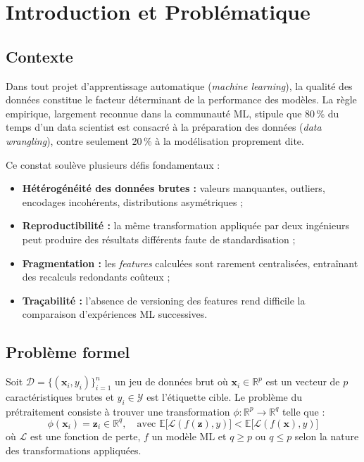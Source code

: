 \documentclass[12pt,a4paper]{article}
\newcounter{defcount}[section]
\newenvironment{definition}[1]{%
  \stepcounter{defcount}%
  \begin{tcolorbox}[defstyle={Définition \thesection.\thedefcount\ — #1}]
}{%
  \end{tcolorbox}
}
\begin{document}
\tableofcontents
\newpage

\section{Introduction et Problématique}

\subsection{Contexte}

Dans tout projet d'apprentissage automatique (\textit{machine learning}), la qualité
des données constitue le facteur déterminant de la performance des modèles.
La règle empirique, largement reconnue dans la communauté ML, stipule que 80\,\% du
temps d'un data scientist est consacré à la préparation des données
(\textit{data wrangling}), contre seulement 20\,\% à la modélisation proprement dite.

Ce constat soulève plusieurs défis fondamentaux :

\begin{itemize}[leftmargin=1.5em]
  \item \textbf{Hétérogénéité des données brutes :} valeurs manquantes, outliers,
    encodages incohérents, distributions asymétriques ;
  \item \textbf{Reproductibilité :} la même transformation appliquée par deux
    ingénieurs peut produire des résultats différents faute de standardisation ;
  \item \textbf{Fragmentation :} les \textit{features} calculées sont rarement
    centralisées, entraînant des recalculs redondants coûteux ;
  \item \textbf{Traçabilité :} l'absence de versioning des features rend difficile
    la comparaison d'expériences ML successives.
\end{itemize}

\subsection{Problème formel}

\begin{definition}{Pipeline de préparation de données}
Soit $\mathcal{D} = \{(\mathbf{x}_i, y_i)\}_{i=1}^{n}$ un jeu de données brut où
$\mathbf{x}_i \in \mathbb{R}^p$ est un vecteur de $p$ caractéristiques brutes et
$y_i \in \mathcal{Y}$ est l'étiquette cible. Le problème du prétraitement consiste
à trouver une transformation $\phi : \mathbb{R}^p \to \mathbb{R}^q$ telle que :
\[
  \phi(\mathbf{x}_i) = \mathbf{z}_i \in \mathbb{R}^q, \quad
  \text{avec } \mathbb{E}\bigl[\mathcal{L}(f(\mathbf{z}), y)\bigr]
  < \mathbb{E}\bigl[\mathcal{L}(f(\mathbf{x}), y)\bigr]
\]
où $\mathcal{L}$ est une fonction de perte, $f$ un modèle ML et $q \geq p$ ou
$q \leq p$ selon la nature des transformations appliquées.
\end{definition}
\end{document}
